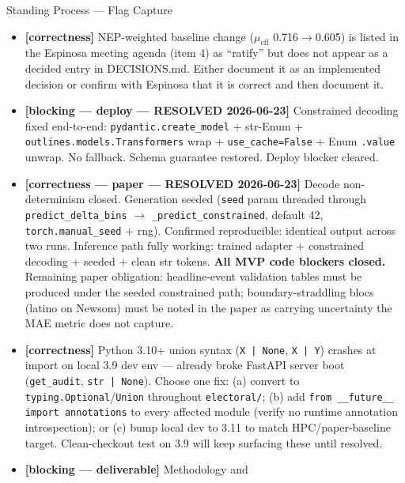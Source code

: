 \documentclass[11pt]{article}
\begin{document}
\begin{taskbox}{Standing Process --- Flag Capture}
{\begin{itemize}[leftmargin=1.6em, itemsep=1pt]
      only) --- flagged in DECISIONS.md for startup/commercial review.
      Confirm the SRP publication, any web demo, and any downstream use
      does not violate the non-commercial clause before submission.
    \item[$\square$] \textbf{[correctness]} NEP-weighted baseline change
      ($\mu_\text{eff}$ 0.716$\to$0.605) is listed in the Espinosa
      meeting agenda (item 4) as ``ratify'' but does not appear as a
      decided entry in DECISIONS.md. Either document it as an
      implemented decision or confirm with Espinosa that it is correct
      and then document it.
    \item[$\boxtimes$] \textbf{[blocking --- deploy --- RESOLVED 2026-06-23]}
      Constrained decoding fixed end-to-end: \texttt{pydantic.create\_model}
      + str-Enum + \texttt{outlines.models.Transformers} wrap +
      \texttt{use\_cache=False} + Enum \texttt{.value} unwrap. No fallback.
      Schema guarantee restored. Deploy blocker cleared.
    \item[$\boxtimes$] \textbf{[correctness --- paper --- RESOLVED 2026-06-23]}
      Decode non-determinism closed. Generation seeded (\texttt{seed} param
      threaded through \texttt{predict\_delta\_bins} $\to$
      \texttt{\_predict\_constrained}, default 42,
      \texttt{torch.manual\_seed} + rng). Confirmed reproducible: identical
      output across two runs. Inference path fully working: trained adapter +
      constrained decoding + seeded + clean str tokens.
      \textbf{All MVP code blockers closed.}
      Remaining paper obligation: headline-event validation tables must be
      produced under the seeded constrained path; boundary-straddling blocs
      (latino on Newsom) must be noted in the paper as carrying uncertainty
      the MAE metric does not capture.
    \item[$\square$] \textbf{[correctness]} Python 3.10+ union syntax
      (\texttt{X | None}, \texttt{X | Y}) crashes at import on local
      3.9 dev env --- already broke FastAPI server boot
      (\texttt{get\_audit}, \texttt{str | None}). Choose one fix:
      (a) convert to \texttt{typing.Optional}/\texttt{Union} throughout
      \texttt{electoral/}; (b) add \texttt{from \_\_future\_\_ import
      annotations} to every affected module (verify no runtime annotation
      introspection); or (c) bump local dev to 3.11 to match
      HPC/paper-baseline target. Clean-checkout test on 3.9 will keep
      surfacing these until resolved.
    \item[$\square$] \textbf{[blocking --- deliverable]} Methodology and

\end{itemize}}
\end{taskbox}
\end{document}
